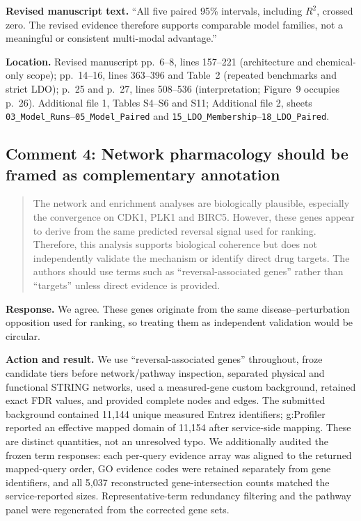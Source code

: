 \documentclass[10pt]{article}
\newenvironment{reviewcomment}{%
  \begin{quote}\small\itshape\color{black}
}{\end{quote}}
\newcommand{\Response}{\textbf{Response.} }
\newcommand{\Action}{\textbf{Action and result.} }
\newcommand{\RevisedText}{\textbf{Revised manuscript text.} }
\newcommand{\Location}{\textbf{Location.} }
\newcommand{\qtext}[1]{``#1''}
\begin{document}
\RevisedText \qtext{All five paired 95\% intervals, including $R^2$, crossed zero. The revised evidence therefore supports comparable model families, not a meaningful or consistent multi-modal advantage.}

\Location Revised manuscript pp.~6--8, lines 157--221 (architecture and chemical-only scope); pp.~14--16, lines 363--396 and Table~2 (repeated benchmarks and strict LDO); p.~25 and p.~27, lines 508--536 (interpretation; Figure~9 occupies p.~26). Additional file 1, Tables S4--S6 and S11; Additional file 2, sheets \texttt{03\_Model\_Runs}--\texttt{05\_Model\_Paired} and \texttt{15\_LDO\_Membership}--\texttt{18\_LDO\_Paired}.

\subsection*{Comment 4: Network pharmacology should be framed as complementary annotation}
\begin{reviewcomment}
The network and enrichment analyses are biologically plausible, especially the convergence on CDK1, PLK1 and BIRC5. However, these genes appear to derive from the same predicted reversal signal used for ranking. Therefore, this analysis supports biological coherence but does not independently validate the mechanism or identify direct drug targets. The authors should use terms such as “reversal-associated genes” rather than “targets” unless direct evidence is provided.
\end{reviewcomment}

\Response We agree. These genes originate from the same disease--perturbation opposition used for ranking, so treating them as independent validation would be circular.

\Action We use \qtext{reversal-associated genes} throughout, froze candidate tiers before network/pathway inspection, separated physical and functional STRING networks, used a measured-gene custom background, retained exact FDR values, and provided complete nodes and edges. The submitted background contained 11,144 unique measured Entrez identifiers; g:Profiler reported an effective mapped domain of 11,154 after service-side mapping. These are distinct quantities, not an unresolved typo. We additionally audited the frozen term responses: each per-query evidence array was aligned to the returned mapped-query order, GO evidence codes were retained separately from gene identifiers, and all 5,037 reconstructed gene-intersection counts matched the service-reported sizes. Representative-term redundancy filtering and the pathway panel were regenerated from the corrected gene sets.
\end{document}
